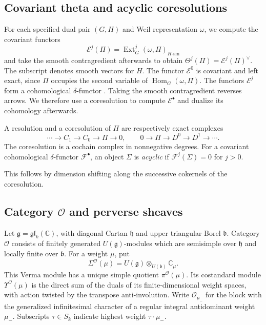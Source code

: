 \documentclass[10pt,a4paper]{article}
\newtheorem{lemma}[theorem]{Lemma}
\theoremstyle{definition}
\theoremstyle{remark}
\numberwithin{equation}{section}
\newcommand{\CC}{\mathbb{C}}
\newcommand{\sm}{\mathrm{sm}}
\DeclareMathOperator{\Hom}{Hom}
\DeclareMathOperator{\Ext}{Ext}
\begin{document}
\subsection{Covariant theta and acyclic coresolutions}

For each specified dual pair $(G,H)$ and Weil representation $\omega$,
we compute the covariant functors
\[
 \mathcal E^j(\Pi)=\Ext_G^j(\omega,\Pi)_{H\text{-}\sm}
\]
and take the smooth contragredient afterwards to obtain
$\Theta^j(\Pi)=\mathcal E^j(\Pi)^\vee$. The subscript denotes smooth
vectors for $H$. The functor $\mathcal E^0$ is covariant and left
exact, since $\Pi$ occupies the second variable of $\Hom_G(\omega,\Pi)$.
The functors $\mathcal E^j$ form a cohomological $\delta$-functor
\cite[Lemma~7.4]{APS2017}. Taking the smooth contragredient reverses
arrows. We therefore use a coresolution to compute
$\mathcal E^\bullet$ and dualize its cohomology afterwards.

A resolution and a coresolution of $\Pi$ are respectively exact complexes
\[
 \cdots\longrightarrow C_1\longrightarrow C_0\longrightarrow \Pi
 \longrightarrow0,\qquad
 0\longrightarrow \Pi\longrightarrow D^0\longrightarrow D^1
 \longrightarrow\cdots .
\]
The coresolution is a cochain complex in nonnegative degrees.
For a covariant cohomological $\delta$-functor $\mathcal F^\bullet$,
an object $\Sigma$ is \emph{acyclic} if $\mathcal F^j(\Sigma)=0$ for $j>0$.

This follows by dimension shifting along the successive cokernels
of the coresolution.

\subsection{Category \texorpdfstring{$\mathcal O$}{O} and perverse sheaves}
\label{prelim:category-o}

Let $\mathfrak g=\mathfrak{gl}_k(\CC)$, with diagonal Cartan
$\mathfrak h$ and upper triangular Borel $\mathfrak b$.
Category $\mathcal O$ consists of finitely generated
$U(\mathfrak g)$-modules which are semisimple over $\mathfrak h$
and locally finite over $\mathfrak b$. For a weight $\mu$, put
\[
 \Sigma^{\mathcal O}(\mu)
 =U(\mathfrak g)\otimes_{U(\mathfrak b)}\CC_\mu.
\]
This Verma module has a unique simple quotient
$\pi^{\mathcal O}(\mu)$. Its costandard module
$\Upsilon^{\mathcal O}(\mu)$ is the direct sum of the duals of its
finite-dimensional weight spaces, with action twisted by the transpose
anti-involution. Write $\mathcal O_{\mu_-}$ for the block with the
generalized infinitesimal character of a regular integral antidominant
weight $\mu_-$. Subscripts $\tau\in S_k$ indicate highest weight
$\tau\mathbin{\cdot}\mu_-$.
\end{document}
